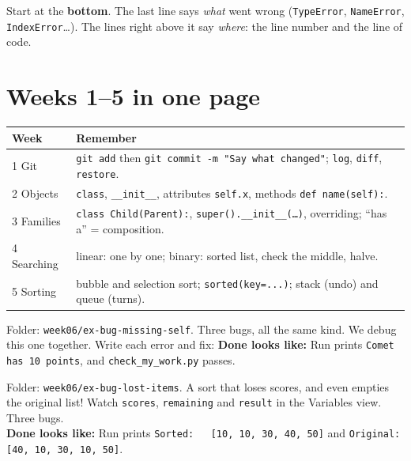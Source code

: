 \begin{tip}
Start at the \textbf{bottom}. The last line says \emph{what} went wrong (\texttt{TypeError}, \texttt{NameError}, \texttt{IndexError}\ldots). The lines right above it say \emph{where}: the line number and the line of code.
\end{tip}

\section{Weeks 1--5 in one page}
\begin{center}
\renewcommand{\arraystretch}{1.25}
\begin{tabular}{@{}p{3cm}p{10.3cm}@{}}
\toprule
\textbf{Week} & \textbf{Remember} \\ \midrule
1 Git & \texttt{git add} then \texttt{git commit -m "Say what changed"}; \texttt{log}, \texttt{diff}, \texttt{restore}. \\
2 Objects & \texttt{class}, \texttt{\_\_init\_\_}, attributes \texttt{self.x}, methods \texttt{def name(self):}. \\
3 Families & \texttt{class Child(Parent):}, \texttt{super().\_\_init\_\_(\ldots)}, overriding; \enquote{has a} = composition. \\
4 Searching & linear: one by one; binary: sorted list, check the middle, halve. \\
5 Sorting & bubble and selection sort; \texttt{sorted(key=...)}; stack (undo) and queue (turns). \\
\bottomrule
\end{tabular}
\end{center}

\begin{exercise}
Folder: \texttt{week06/ex-bug-missing-self}. Three bugs, all the same kind. We debug this one together. Write each error and fix:
\textbf{Done looks like:} Run prints \texttt{Comet has 10 points}, and \texttt{check\_my\_work.py} passes.
\end{exercise}

\begin{exercise}
Folder: \texttt{week06/ex-bug-lost-items}. A sort that loses scores, and even empties the original list! Watch \texttt{scores}, \texttt{remaining} and \texttt{result} in the Variables view. Three bugs.\\
\textbf{Done looks like:} Run prints \texttt{Sorted:\ \ \ [10, 10, 30, 40, 50]} and \texttt{Original: [40, 10, 30, 10, 50]}.
\end{exercise}

